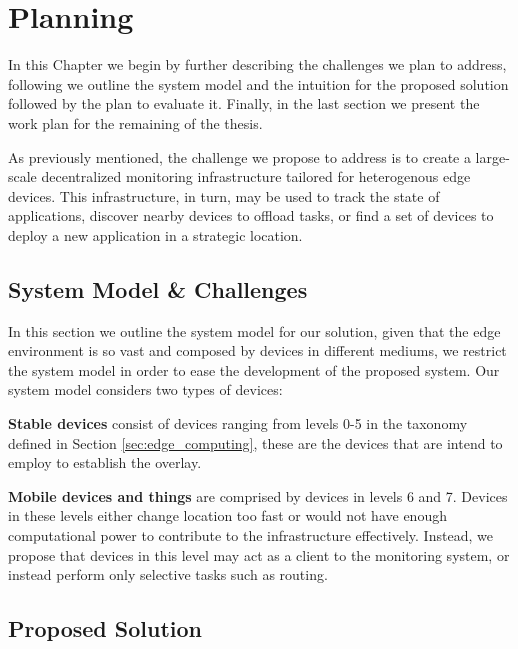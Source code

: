 \chapter{Planning} \label{cha:planning}

In this Chapter we begin by further describing the challenges we plan to address, following we outline the system model and the intuition for the proposed solution followed by the plan to evaluate it. Finally, in the last section we present the work plan for the remaining of the thesis. 

As previously mentioned, the challenge we propose to address is to create a large-scale decentralized monitoring infrastructure tailored for heterogenous edge devices. This infrastructure, in turn, may be used to track the state of  applications, discover nearby devices to offload tasks, or find a set of devices to deploy a new application in a strategic location.

\section{System Model \& Challenges}

In this section we outline the system model for our solution, given that the edge environment is so vast and composed by devices in different mediums, we restrict the system model in order to ease the development of the proposed system. Our system model considers two types of devices:

\textbf{Stable devices} consist of devices ranging from levels 0-5 in the taxonomy defined in Section \ref{sec:edge_computing}, these are the devices that are intend to employ to establish the overlay. 

\textbf{Mobile devices and things} are comprised by devices in levels 6 and 7. Devices in these levels either change location too fast or would not have enough computational power to contribute to the infrastructure effectively. Instead, we propose that devices in this level may act as a client to the monitoring system, or instead perform only selective tasks such as routing. 



\section{Proposed Solution}
\label{cha:proposed_sol}

